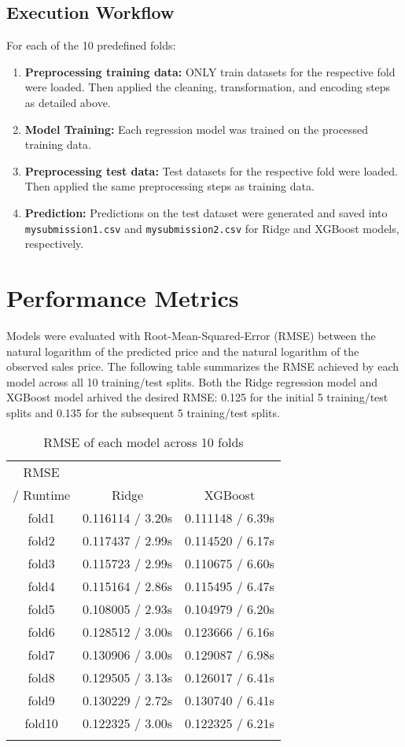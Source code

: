 \documentclass[11pt,a4paper]{article}
\begin{document}
\subsection{Execution Workflow}
For each of the 10 predefined folds:
\begin{enumerate}
  \item \textbf{Preprocessing training data:} ONLY train datasets for the respective fold were loaded. Then applied the cleaning, transformation, and encoding steps as detailed above.
  \item \textbf{Model Training:} Each regression model was trained on the processed training data.
  \item \textbf{Preprocessing test data:} Test datasets for the respective fold were loaded. Then applied the same preprocessing steps as training data.
  \item \textbf{Prediction:} Predictions on the test dataset were generated and saved into \texttt{mysubmission1.csv} and \texttt{mysubmission2.csv} for Ridge and XGBoost models, respectively.
\end{enumerate}

\section{Performance Metrics}
Models were evaluated with Root-Mean-Squared-Error (RMSE) between the natural
logarithm of the predicted price and the natural logarithm of the observed
sales price. The following table summarizes the RMSE achieved by each model
across all 10 training/test splits. Both the Ridge regression model and XGBoost
model arhived the desired RMSE: 0.125 for the initial 5 training/test splits
and 0.135 for the subsequent 5 training/test splits.

\begin{table}[h]
  \centering
  \begin{tabular}{c c c}
    \Xhline{2\arrayrulewidth}
    RMSE \\
    / Runtime & Ridge    & XGBoost  \\
    \hline
    fold1  & 0.116114 / 3.20s & 0.111148 / 6.39s \\
    fold2  & 0.117437 / 2.99s & 0.114520 / 6.17s \\
    fold3  & 0.115723 / 2.99s & 0.110675 / 6.60s \\
    fold4  & 0.115164 / 2.86s & 0.115495 / 6.47s \\
    fold5  & 0.108005 / 2.93s & 0.104979 / 6.20s \\
    fold6  & 0.128512 / 3.00s & 0.123666 / 6.16s \\
    fold7  & 0.130906 / 3.00s & 0.129087 / 6.98s \\
    fold8  & 0.129505 / 3.13s & 0.126017 / 6.41s \\
    fold9  & 0.130229 / 2.72s & 0.130740 / 6.41s \\
    fold10 & 0.122325 / 3.00s & 0.122325 / 6.21s \\
    \Xhline{2\arrayrulewidth}
  \end{tabular}
  \caption{RMSE of each model across 10 folds}
\end{table}
\end{document}
